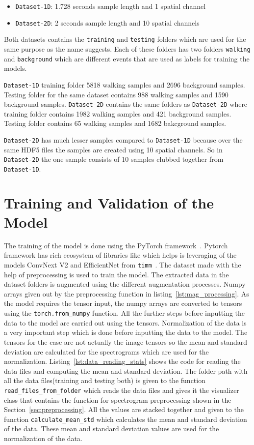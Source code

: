 \begin {itemize}
\item \texttt{Dataset-1D}: 1.728 seconds sample length and 1 spatial channel
\item \texttt{Dataset-2D}: 2 seconds sample length and 10 spatial channels
\end {itemize}

Both datasets contains the \texttt{training} and \texttt{testing} folders which are used for the same purpose as the name suggests. Each of these folders has two folders \texttt{walking} and \texttt{background} which are different events that are used as labels for training the models.

\texttt{Dataset-1D} training folder 5818 walking samples and 2696 background samples. Testing folder for the same dataset contains 988 walking samples and 1590 background samples. \texttt{Dataset-2D} contains the same folders as \texttt{Dataset-2D} where training folder contains 1982 walking samples and 421 background samples. Testing folder contains 65 walking samples and 1682 bakcground samples.

\texttt{Dataset-2D} has much lesser samples compared to \texttt{Dataset-1D} because over the same HDF5 files the samples are created using 10 spatial channels. So in \texttt{Dataset-2D} the one sample consists of 10 samples clubbed together from \texttt{Dataset-1D}. 
  
\section{Training and Validation of the Model}
The training of the model is done using the PyTorch framework~\cite{PyTorch_website}. Pytorch framework has rich ecosystem of libraries like which helps is leveraging of the models ConvNext V2 and EfficientNet from \texttt{timm}~\cite{rw2019timm}. The dataset made with the help of preprocessing is used to train the model. The extracted data in the dataset folders is augmented using the different augmentation processes. Numpy arrays given out by the preprocessing function in listing~\ref{lst:mag_processing}. As the model requires the tensor input, the numpy arrays are converted to tensors using the \texttt{torch.from\_numpy} function. All the further steps before inputting the data to the model are carried out using the tensors. Normalization of the data is a very important step which is done before inputting the data to the model. The tensors for the case are not actually the image tensors so the mean and standard deviation are calculated for the spectrograms which are used for the normalization. Listing~\ref{lst:data_reading_stats} shows the code for reading the data files and computing the mean and standard deviation. The folder path with all the data files(training and testing both) is given to the function \texttt{read\_files\_from\_folder} which reads the data files and gives it the visualizer class that contains the function for spectrogram preprocessing shown in the Section~\ref{sec:preprocessing}. All the values are stacked together and given to the function \texttt{calculate\_mean\_std} which calculates the mean and standard deviation of the data. These mean and standard deviation values are used for the normalization of the data.

